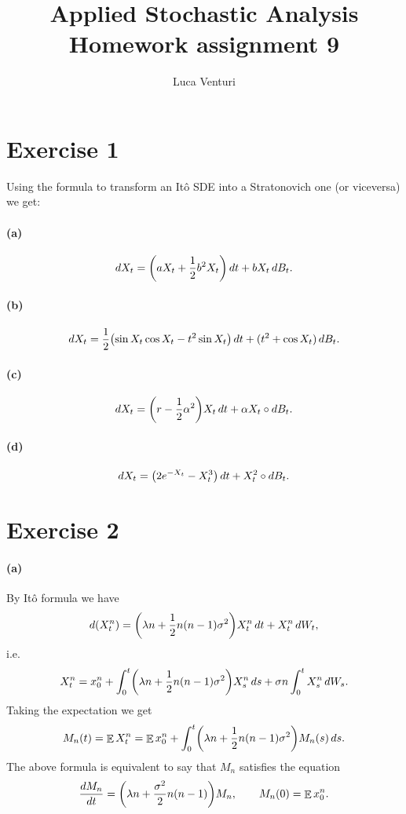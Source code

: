 \documentclass[a4paper,11pt]{article}
\theoremstyle{definition}
\theoremstyle{plain}
\theoremstyle{remark}
\DeclarePairedDelimiter{\parr}{(}{)}
\DeclareMathOperator*{\expval}{\mathbb{E}}
\begin{document}
\title{Applied Stochastic Analysis \\ Homework assignment 9}
\author{Luca Venturi}
\maketitle

\section*{Exercise 1}

Using the formula to transform an It\^o SDE into a Stratonovich one (or viceversa) we get:

\paragraph*{(a)}

$$
dX_t = \parr*{aX_t + \frac{1}{2}b^2X_t} \,dt + bX_t\,dB_t. 
$$

\paragraph*{(b)}

$$
dX_t = \frac{1}{2}\parr*{\sin X_t\cos X_t - t^2\sin X_t} \,dt + (t^2 + \cos X_t)\,dB_t. 
$$

\paragraph*{(c)}

$$
dX_t = \parr*{r-\frac{1}{2}\alpha^2}X_t\,dt + \alpha X_t\circ dB_t. 
$$

\paragraph*{(d)}

$$
dX_t = \parr*{2e^{-X_t} - X_t^3}\,dt + X_t^2\circ dB_t.
$$

\section*{Exercise 2}

\paragraph*{(a)}

By It\^o formula we have 
$$
d(X^n_t) = \parr*{\lambda n + \frac{1}{2}n(n-1)\sigma^2}X^n_t\,dt + X^n_t\,dW_t,
$$
i.e.
$$
X_t^n = x_0^n + \int_0^t \parr*{\lambda n  + \frac{1}{2}n(n-1)\sigma^2}X^n_s\,ds + \sigma n \int_0^t X^n_s\,dW_s.
$$
Taking the expectation we get
$$
M_n(t) = \expval X_t^n = \expval x_0^n + \int_0^t \parr*{\lambda n  + \frac{1}{2}n(n-1)\sigma^2}M_n(s)\,ds.
$$
The above formula is equivalent to say that $M_n$ satisfies the equation
\begin{equation}\label{ex2:ode}
\frac{dM_n}{dt} = \parr*{\lambda n +\frac{\sigma^2}{2}n(n-1)}M_n, \qquad M_n(0) = \expval x_0^n.
\end{equation}
\end{document}
